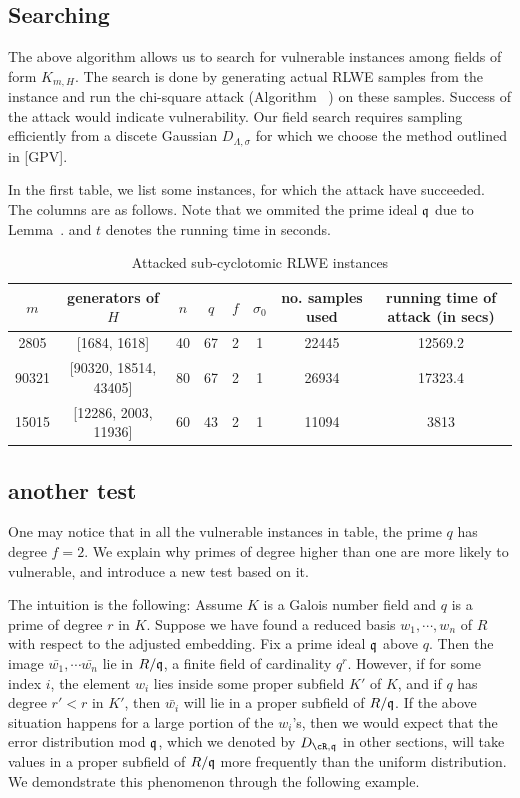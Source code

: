 \documentclass{amsart}
\begin{document}
\subsection{Searching}

The above algorithm allows us to search for vulnerable instances among fields of form $K_{m,H}$. The search is done by generating actual RLWE samples from the instance and run the chi-square attack (Algorithm ~) on these samples. Success of the attack would indicate vulnerability. Our field search requires sampling efficiently from a discete Gaussian $D_{\Lambda, \sigma}$ for which we choose the method outlined in [GPV].

In the first table, we list some instances, for which the attack have succeeded. The columns are as follows. Note that we ommited the prime ideal $\mathfrak{q}$ due to Lemma~.  and $t$ denotes the running time in seconds.

\begin{table}[H]
\caption{Attacked sub-cyclotomic RLWE instances}
\begin{tabular}{c|c|c|c|c|c|c|c}
$m$ & generators of $H$ & $n$ & $q$ & $f$ & $\sigma_0$ & no. samples used & running time of attack (in secs) \\ \hline
2805 &  [1684, 1618] & 40 & 67 & 2 & 1 & 22445 & 12569.2 \\
90321 & [90320, 18514, 43405] & 80 & 67 & 2 & 1 & 26934 & 17323.4 \\
15015 & [12286, 2003, 11936] & 60 & 43 & 2 & 1 & 11094 & 3813
\end{tabular}
\end{table}


\subsection{another test}

One may notice that in all the vulnerable instances in table, the prime $q$ has degree $f = 2$. We explain why primes of degree higher than one are more likely to vulnerable, and introduce a new test based on it.

The intuition is the following: Assume $K$ is a Galois number field and $q$ is a prime of degree $r$ in $K$. Suppose we have found a reduced basis $w_1,\cdots, w_n$ of $R$ with respect to the adjusted embedding. Fix a prime ideal $\mathfrak{q}$ above $q$. Then the image $\bar{w_1}, \cdots \bar{w_n}$ lie in $R/\mathfrak{q}$, a finite field of cardinality $q^r$. However, if for some index $i$, the element $w_i$ lies inside some proper subfield $K'$ of $K$, and if $q$ has degree $r' < r$ in $K'$, then  $\bar{w_i}$ will lie in a proper subfield of $R/\mathfrak{q}$. If the above situation happens for a large portion of the $w_i$'s, then we would expect that the error distribution mod $\mathfrak{q}$, which we denoted by $D_{\cR,\fq}$ in other sections, will take values in a proper subfield of $R/\mathfrak{q}$ more frequently than the uniform distribution. We demondstrate this phenomenon through the following example.
\end{document}
